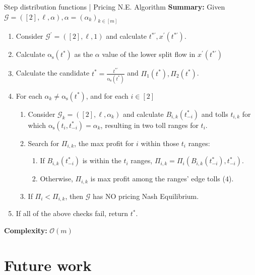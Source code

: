 \documentclass{beamer}
\newcommand{\as}{\mathrm{\alpha_s}}
\newcommand{\Gm}{\mathcal{G}}
\begin{document}
\begin{frame}{Step distribution functions | Pricing N.E. Algorithm}
	\textbf{Summary:} Given $\Gm = ([2], \ell, \alpha), \alpha = (\alpha_k)_{k \in [m]}$
	\begin{enumerate}
		\item Consider $\Gm^\prime = ([2], \ell, 1)$ and calculate $t^{*\prime}, x^\prime(t^{*\prime})$.
		\item Calculate $\as(t^*)$ as the $\alpha$ value of the lower split flow in $x^\prime(t^{*\prime})$
		\item Calculate the candidate $t^* = \tfrac{t^{*\prime}}{\as(t^*)}$ and $\Pi_1(t^*), \Pi_2(t^*)$.
		\item For each $\alpha_k \ne \as(t^*)$, and for each $i \in [2]$
		\begin{enumerate}[$4.1$]
			\item Consider $\Gm_k = ([2], \ell, \alpha_k)$ and calculate $B_{i, k}(t_{-i}^*)$ and tolls $t_{i, k}$ for which $\as(t_i, t_{-i}^*) = \alpha_k$, resulting in two toll ranges for $t_i$.
			\item Search for $\Pi_{i, k}$, the max profit for $i$ within those $t_i$ ranges:
			\begin{enumerate}[$4.2.1$]
				\item If $B_{i, k}(t_{-i}^*)$ is within the $t_i$ ranges, $\Pi_{i, k} = \Pi_i(B_{i, k}(t_{-i}^*), t_{-i}^*)$.
				\item Otherwise, $\Pi_{i, k}$ is max profit among the ranges' edge tolls ($4$).
			\end{enumerate}
			\item If $\Pi_i < \Pi_{i, k}$, then $\Gm$ has NO pricing Nash Equilibrium.
		\end{enumerate}
		\item If all of the above checks fail, return $t^*$.
	\end{enumerate}
	\textbf{Complexity:} $\mathcal{O}(m)$
\end{frame}

\section{Future work}
\end{document}
